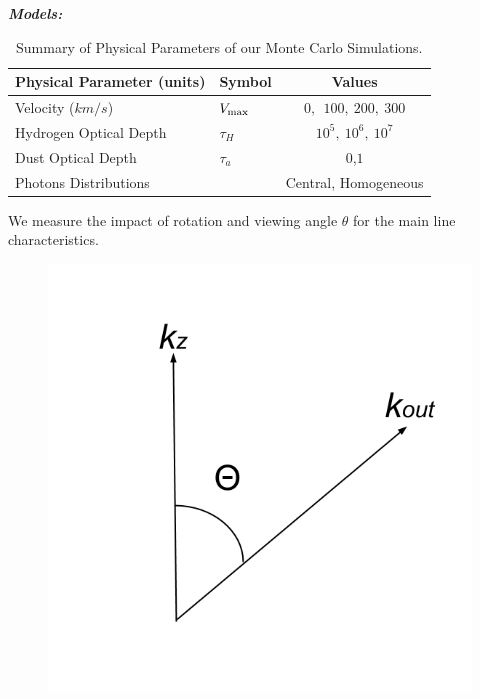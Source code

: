 \documentclass{beamer}
\begin{document}
\begin{frame}{\textit{\textbf{Models:}}}
\begin{table}
\begin{center}
\begin{tabular}{llc}\hline\hline
Physical Parameter (units) & Symbol & Values\\\hline
Velocity ($km/s$) & $V_{\rm max}$&$0,\ \ 100,\ 200,\ 300$\\
Hydrogen Optical Depth & $\tau_{H} $ & $10^{5},\ 10^{6},\ 10^{7}$\\
Dust Optical Depth & $\tau_{a}$ & $0$,$1$\\
Photons Distributions & & Central, Homogeneous\\\hline\hline
\end{tabular}
\caption{Summary of Physical Parameters of our Monte Carlo Simulations.}
\end{center}
\end{table}
\end{frame}


\begin{frame}
\LARGE{We measure the impact of rotation and viewing angle $\theta$ for the 
main line characteristics.}
\begin{figure}
\includegraphics[scale=0.2]{Figures/theta.png}
\end{figure}
\end{frame}
\end{document}

